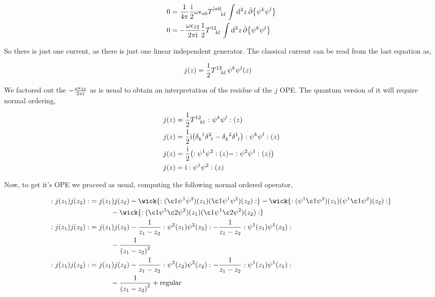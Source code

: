 \begin{align*}
    0&=\frac{1}{4\pi}\frac\im 2\omega\epsilon_{ab}\tensor{T}{^{\qty[ab]}_k_l}\int\dd[2]{z}\bar\partial\qty{\psi^k\psi^l}\\
    0&=-\frac{\omega\epsilon_{12}}{2\pi\im}\frac12\tensor{T}{^{12}_k_l}\int\dd[2]{z}\bar\partial\qty{\psi^k\psi^l}
\end{align*}

So there is just one current, as there is just one linear independent generator. The classical current can be read from the last equation as,

\begin{align*}
    j\qty(z)&=\frac12\tensor{T}{^{12}_k_l}{\psi^k\psi^l}\qty(z)
\end{align*}

We factored out the $-\frac{\omega\epsilon_{12}}{2\pi\textnormal{i}}$ as is usual to obtain an interpretation of the residue of the $j$ OPE. 
The quantum version of it will require normal ordering,

\begin{align*}
    j\qty(z)&=\frac12\tensor{T}{^{12}_k_l}\cnord{\psi^k\psi^l}\qty(z)\\
    j\qty(z)&=\frac12\im\qty(\tensor{\delta}{_k^1}\tensor{\delta}{^2_l}-\tensor{\delta}{_k^2}\tensor{\delta}{^1_l})\cnord{\psi^k\psi^l}\qty(z)\\
    j\qty(z)&=\frac\im2\qty(\cnord{\psi^1\psi^2}\qty(z)-\cnord{\psi^2\psi^1}\qty(z))\\
    j\qty(z)&=\im\cnord{\psi^1\psi^2}\qty(z)
\end{align*}

Now, to get it's OPE we proceed as usual, computing the following normal ordered operator,

\begin{align*}
    \cnord{j\qty(z_1)j\qty(z_2)}&=j\qty(z_1)j\qty(z_2)-\wick{\cnord{(\c1\psi^1\psi^2)\qty(z_1)(\c1\psi^1\psi^2)\qty(z_2)}}-\wick{\cnord{(\psi^1\c1\psi^2)\qty(z_1)(\psi^1\c1\psi^2)\qty(z_2)}}\\
    &\quad\quad\quad-\wick{\cnord{(\c1\psi^1\c2\psi^2)\qty(z_1)(\c1\psi^1\c2\psi^2)\qty(z_2)}}\\
    \cnord{j\qty(z_1)j\qty(z_2)}&=j\qty(z_1)j\qty(z_2)-\frac{1}{z_1-z_2}\cnord{\psi^2\qty(z_1)\psi^2\qty(z_2)}-\frac{1}{z_1-z_2}\cnord{\psi^1\qty(z_1)\psi^1\qty(z_2)}\\
    &\quad\quad\quad-\frac{1}{\qty(z_1-z_2)^2}\\
    \cnord{j\qty(z_1)j\qty(z_2)}&=j\qty(z_1)j\qty(z_2)-\frac{1}{z_1-z_2}\cnord{\psi^2\qty(z_2)\psi^2\qty(z_2)}-\frac{1}{z_1-z_2}\cnord{\psi^1\qty(z_1)\psi^1\qty(z_1)}\\
    &\quad\quad\quad-\frac{1}{\qty(z_1-z_2)^2}+\textnormal{regular}
\end{align*}

